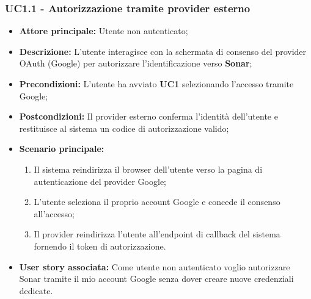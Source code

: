 \subsubsection{UC1.1 - Autorizzazione tramite provider esterno}
\begin{itemize}
    \item \textbf{Attore principale:} Utente non autenticato;
    \item \textbf{Descrizione:} L'utente interagisce con la schermata di consenso del provider OAuth (Google) per autorizzare l'identificazione verso \textbf{Sonar};
    \item \textbf{Precondizioni:} L'utente ha avviato \textbf{UC1} selezionando l'accesso tramite Google;
    \item \textbf{Postcondizioni:} Il provider esterno conferma l'identità dell'utente e restituisce al sistema un codice di autorizzazione valido;
    \item \textbf{Scenario principale:}
    \begin{enumerate}
        \item Il sistema reindirizza il browser dell'utente verso la pagina di autenticazione del provider Google;
        \item L'utente seleziona il proprio account Google e concede il consenso all'accesso;
        \item Il provider reindirizza l'utente all'endpoint di callback del sistema fornendo il token di autorizzazione.
    \end{enumerate}
    \item \textbf{User story associata:} Come utente non autenticato voglio autorizzare Sonar tramite il mio account Google senza dover creare nuove credenziali dedicate.
\end{itemize}

